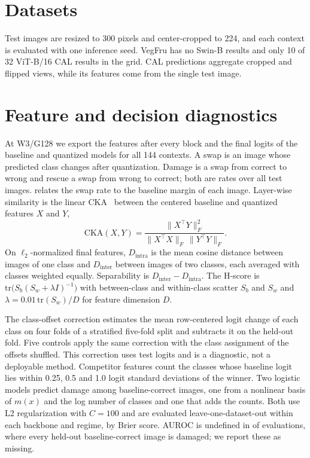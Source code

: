 \section{Datasets}
\label{sec:datasets}



Test images are resized to 300 pixels and center-cropped to 224, and each context is evaluated with one inference seed.
VegFru has no Swin-B results and only 10 of 32 ViT-B/16 CAL results in the grid.
CAL predictions aggregate cropped and flipped views, while its features come from the single test image.

\section{Feature and decision diagnostics}
\label{sec:diagnostics}

At W3/G128 we export the features after every block and the final logits of the baseline and quantized models for all 144 contexts.
A swap is an image whose predicted class changes after quantization.
Damage is a swap from correct to wrong and rescue a swap from wrong to correct; both are rates over all test images.
 relates the swap rate to the baseline margin of each image.
Layer-wise similarity is the linear CKA~\cite{kornblith2019similarity} between the centered baseline and quantized features $X$ and $Y$,
\begin{equation}
  \mathrm{CKA}(X, Y) = \frac{\lVert X^{\top} Y \rVert_F^2}{\lVert X^{\top} X \rVert_F \, \lVert Y^{\top} Y \rVert_F}.
  \label{eq:cka}
\end{equation}
On $\ell_2$-normalized final features, $D_{\mathrm{intra}}$ is the mean cosine distance between images of one class and $D_{\mathrm{inter}}$ between images of two classes, each averaged with classes weighted equally.
Separability is $D_{\mathrm{inter}} - D_{\mathrm{intra}}$.
The H-score is $\mathrm{tr}\big(S_b (S_w + \lambda I)^{-1}\big)$ with between-class and within-class scatter $S_b$ and $S_w$ and $\lambda = 0.01\,\mathrm{tr}(S_w)/D$ for feature dimension $D$.

The class-offset correction estimates the mean row-centered logit change of each class on four folds of a stratified five-fold split and subtracts it on the held-out fold.
Five controls apply the same correction with the class assignment of the offsets shuffled.
This correction uses test logits and is a diagnostic, not a deployable method.
Competitor features count the classes whose baseline logit lies within 0.25, 0.5 and 1.0 logit standard deviations of the winner.
Two logistic models predict damage among baseline-correct images, one from a nonlinear basis of $m(x)$ and the log number of classes and one that adds the counts.
Both use L2 regularization with $C=100$ and are evaluated leave-one-dataset-out within each backbone and regime, by Brier score.
AUROC is undefined in  of  evaluations, where every held-out baseline-correct image is damaged; we report these as missing.

